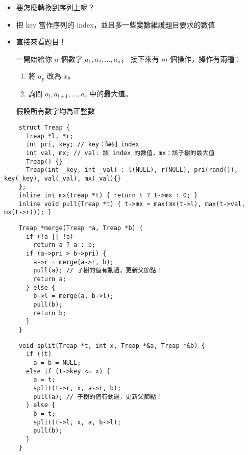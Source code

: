 \documentclass[standalone]{beamer}
\begin{document}
\begin{frame}[fragile]{}
  \begin{itemize}
    \item 要怎麼轉換到序列上呢？
    \item 把 key 當作序列的 index，並且多一些變數維護題目要求的數值
    \item 直接來看題目！
    \begin{problem}
      一開始給你 $n$ 個數字 $a_1, a_2, \ldots, a_n$，
      接下來有 $m$ 個操作，操作有兩種：
      \begin{enumerate}
          \item 將 $a_p$ 改為 $x$。
          \item 詢問 $a_l, a_{l+1}, \ldots, a_r$ 中的最大值。
      \end{enumerate}
      假設所有數字均為正整數
    \end{problem}
  \end{itemize}
\end{frame}

\begin{frame}[fragile]{}
  \begin{verbatim}
    struct Treap {
      Treap *l, *r;
      int pri, key; // key：陣列 index
      int val, mx; // val: 該 index 的數值，mx：該子樹的最大值
      Treap() {}
      Treap(int _key, int _val) : l(NULL), r(NULL), pri(rand()), key(_key), val(_val), mx(_val){}
    };
    inline int mx(Treap *t) { return t ? t->mx : 0; }
    inline void pull(Treap *t) { t->mx = max(mx(t->l), max(t->val, mx(t->r))); }
  \end{verbatim}
\end{frame}

\begin{frame}[fragile]{}
  \begin{verbatim}
    Treap *merge(Treap *a, Treap *b) {
      if (!a || !b)
        return a ? a : b;
      if (a->pri > b->pri) {
        a->r = merge(a->r, b);
        pull(a); // 子樹的值有動過，更新父節點！
        return a;
      } else {
        b->l = merge(a, b->l);
        pull(b);
        return b;
      }
    }
  \end{verbatim}
\end{frame}

\begin{frame}[fragile]{}
  \begin{verbatim}
    void split(Treap *t, int x, Treap *&a, Treap *&b) {
      if (!t)
        a = b = NULL;
      else if (t->key <= x) {
        a = t;
        split(t->r, x, a->r, b);
        pull(a); // 子樹的值有動過，更新父節點！
      } else {
        b = t;
        split(t->l, x, a, b->l);
        pull(b);
      }
    }
  \end{verbatim}
\end{frame}
\end{document}
